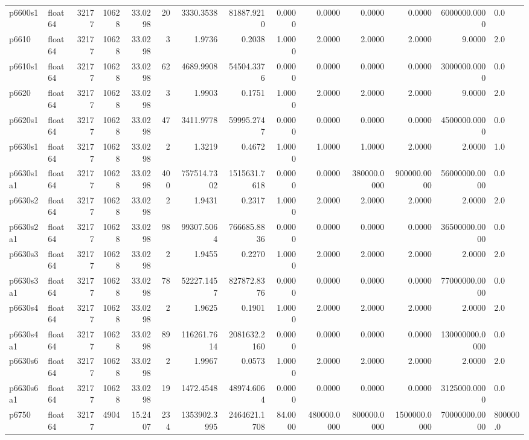 \begin{longtable}{llrrrrrrrrrrrl}
p6600s1 & float64 & 32177 & 10628 & 33.0298 & 20 & 3330.3538 & 81887.9210 & 0.0000 & 0.0000 & 0.0000 & 0.0000 & 6000000.0000 & 0.0 \\
p6610 & float64 & 32177 & 10628 & 33.0298 & 3 & 1.9736 & 0.2038 & 1.0000 & 2.0000 & 2.0000 & 2.0000 & 9.0000 & 2.0 \\
p6610s1 & float64 & 32177 & 10628 & 33.0298 & 62 & 4689.9908 & 54504.3376 & 0.0000 & 0.0000 & 0.0000 & 0.0000 & 3000000.0000 & 0.0 \\
p6620 & float64 & 32177 & 10628 & 33.0298 & 3 & 1.9903 & 0.1751 & 1.0000 & 2.0000 & 2.0000 & 2.0000 & 9.0000 & 2.0 \\
p6620s1 & float64 & 32177 & 10628 & 33.0298 & 47 & 3411.9778 & 59995.2747 & 0.0000 & 0.0000 & 0.0000 & 0.0000 & 4500000.0000 & 0.0 \\
p6630s1 & float64 & 32177 & 10628 & 33.0298 & 2 & 1.3219 & 0.4672 & 1.0000 & 1.0000 & 1.0000 & 2.0000 & 2.0000 & 1.0 \\
p6630s1a1 & float64 & 32177 & 10628 & 33.0298 & 400 & 757514.7302 & 1515631.7618 & 0.0000 & 0.0000 & 380000.0000 & 900000.0000 & 56000000.0000 & 0.0 \\
p6630s2 & float64 & 32177 & 10628 & 33.0298 & 2 & 1.9431 & 0.2317 & 1.0000 & 2.0000 & 2.0000 & 2.0000 & 2.0000 & 2.0 \\
p6630s2a1 & float64 & 32177 & 10628 & 33.0298 & 98 & 99307.5064 & 766685.8836 & 0.0000 & 0.0000 & 0.0000 & 0.0000 & 36500000.0000 & 0.0 \\
p6630s3 & float64 & 32177 & 10628 & 33.0298 & 2 & 1.9455 & 0.2270 & 1.0000 & 2.0000 & 2.0000 & 2.0000 & 2.0000 & 2.0 \\
p6630s3a1 & float64 & 32177 & 10628 & 33.0298 & 78 & 52227.1457 & 827872.8376 & 0.0000 & 0.0000 & 0.0000 & 0.0000 & 77000000.0000 & 0.0 \\
p6630s4 & float64 & 32177 & 10628 & 33.0298 & 2 & 1.9625 & 0.1901 & 1.0000 & 2.0000 & 2.0000 & 2.0000 & 2.0000 & 2.0 \\
p6630s4a1 & float64 & 32177 & 10628 & 33.0298 & 89 & 116261.7614 & 2081632.2160 & 0.0000 & 0.0000 & 0.0000 & 0.0000 & 130000000.0000 & 0.0 \\
p6630s6 & float64 & 32177 & 10628 & 33.0298 & 2 & 1.9967 & 0.0573 & 1.0000 & 2.0000 & 2.0000 & 2.0000 & 2.0000 & 2.0 \\
p6630s6a1 & float64 & 32177 & 10628 & 33.0298 & 19 & 1472.4548 & 48974.6064 & 0.0000 & 0.0000 & 0.0000 & 0.0000 & 3125000.0000 & 0.0 \\
p6750 & float64 & 32177 & 4904 & 15.2407 & 234 & 1353902.3995 & 2464621.1708 & 84.0000 & 480000.0000 & 800000.0000 & 1500000.0000 & 70000000.0000 & 800000.0 \\

\end{longtable}
